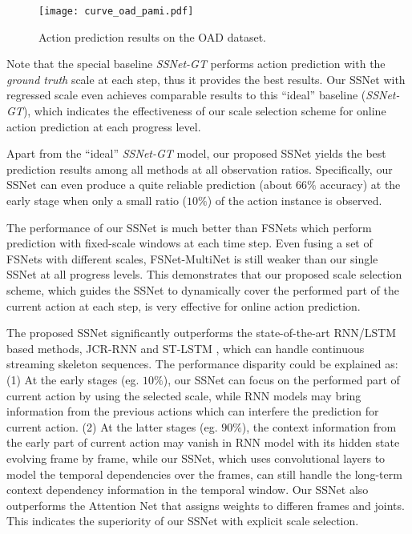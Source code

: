 \documentclass[10pt,twocolumn,letterpaper]{article}
\begin{document}
\begin{figure}[htbp]
		\centering
		\centerline{\texttt{[image: curve\_oad\_pami.pdf]}}
	\caption{Action prediction results on the OAD dataset.}
	\label{fig:result_curves_OAD}
\end{figure}


Note that the special baseline \emph{SSNet-GT} performs action prediction with the \emph{ground truth} scale at each step, thus it provides the best results.
Our SSNet with regressed scale even achieves comparable results to this ``ideal'' baseline (\emph{SSNet-GT}),
which indicates the effectiveness of our scale selection scheme for online action prediction at each progress level.

Apart from the ``ideal'' \emph{SSNet-GT} model,
our proposed SSNet yields the best prediction results among all methods at all observation ratios.
Specifically, our SSNet can even produce a quite reliable prediction (about $66\%$ accuracy) at the early stage when only a small ratio ($10\%$) of the action instance is observed.





The performance of our SSNet is much better than FSNets which perform prediction with fixed-scale windows at each time step.
Even fusing a set of FSNets with different scales,
FSNet-MultiNet is still weaker than our single SSNet at all progress levels.
This demonstrates that our proposed scale selection scheme,
which guides the SSNet to dynamically cover the performed part of the current action at each step,
is very effective for online action prediction.


The proposed SSNet significantly outperforms the state-of-the-art RNN/LSTM based methods, JCR-RNN \cite{li2016online} and ST-LSTM \cite{liu2017PAMI},
which can handle continuous streaming skeleton sequences. The performance disparity could be explained as:
(1) At the early stages (eg. $10\%$), our SSNet can focus on the performed part of current action by using the selected scale,
while RNN models \cite{li2016online,liu2017PAMI} may bring information from the previous actions which can interfere the prediction for current action.
(2) At the latter stages (eg. $90\%$), the context information from the early part of current action may vanish in RNN model with its hidden state evolving frame by frame,
while our SSNet, which uses convolutional layers to model the temporal dependencies over the frames, can still handle the long-term context dependency information in the temporal window.
Our SSNet also outperforms the Attention Net \cite{liu2017global} that assigns weights to differen frames and joints.
This indicates the superiority of our SSNet with explicit scale selection.
\end{document}
